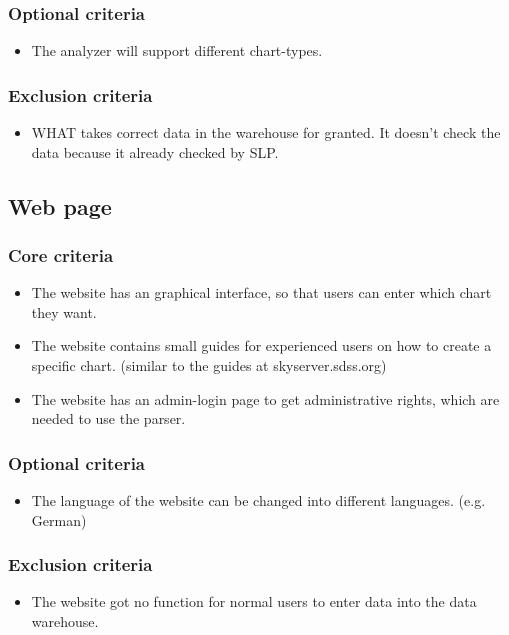 \subsubsection{Optional criteria}
\begin{itemize}
\item The analyzer will support different chart-types.
\end{itemize}

\subsubsection{Exclusion criteria}
\begin{itemize}
\item WHAT takes correct data in the warehouse for granted. It doesn't check the
 data because it already checked by SLP. 
\end{itemize}

\subsection{Web page}
\subsubsection{Core criteria}
\begin{itemize}
\item The website has an graphical interface, 
so that users can enter which chart they want.

\item The website contains small guides for experienced users on how to create a specific chart. 
(similar to the guides at skyserver.sdss.org)

\item The website has an admin-login page to get administrative rights, which are needed to use the parser.
\end{itemize}

\subsubsection{Optional criteria}
\begin{itemize}
\item The language of the website can be changed into different languages. (e.g. German)
\end{itemize}

\subsubsection{Exclusion criteria}
\begin{itemize}
\item The website got no function for normal users to enter data into the data warehouse.
\end{itemize}


